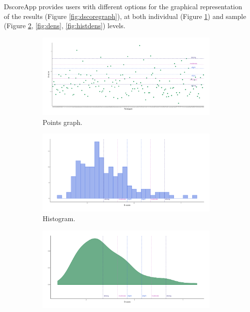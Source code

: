 \documentclass[12pt]{book}
\begin{document}
DscoreApp provides users with different options for the graphical representation of the results (Figure \ref{fig:dscoregraph}), at both individual (Figure \ref{fig:point}) and sample (Figure \ref{fig:hist}, \ref{fig:dens}, \ref{fig:histdens}) levels. 
%
\begin{figure}[h!]
	\centering 
	\begin{subfigure}{0.4\linewidth}
		\includegraphics[width=\linewidth]{PointDefaultDscore3.pdf}
		\caption{Points graph.}
		\label{fig:point}
	\end{subfigure}
	\begin{subfigure}{0.4\linewidth}
		\includegraphics[width=\linewidth]{HistogramDscore3.pdf}
		\caption{Histogram.}
		\label{fig:hist}
	\end{subfigure}
	\begin{subfigure}{0.4\linewidth}
		\includegraphics[width=\linewidth]{DensityDscore3.pdf}

\end{subfigure}
\end{figure}
\end{document}
